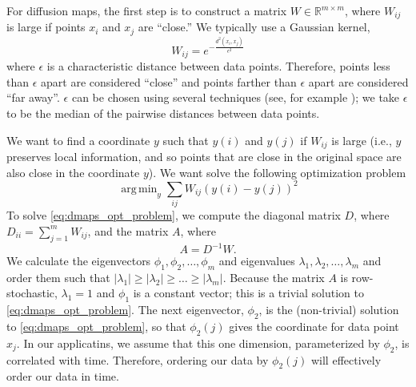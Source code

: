 \documentclass{pnastwo}
\DeclareMathOperator*{\argmin}{arg\,min}
\begin{document}
\begin{article}
\begin{materials}
For diffusion maps, the first step is to construct a matrix $W \in \mathbb{R}^{m \times m}$, where $W_{ij}$ is large if points $x_i$ and $x_j$ are ``close.'' 
%
%
We typically use a Gaussian kernel, 
\begin{equation} \label{eq:dmaps_W}
W_{ij} = e^{ -\frac{d^2(x_i, x_j)}{\epsilon^2}}
\end{equation}
where $\epsilon$ is a characteristic distance between data points.
%
Therefore, points less than $\epsilon$ apart are considered ``close'' and points farther than $\epsilon$ apart are considered ``far away''.
%
$\epsilon$ can be chosen using several techniques (see, for example \cite{coifman2008graph}); we take $\epsilon$ to be the median of the pairwise distances between data points.

We want to find a coordinate $y$ such that $y(i)$ and $y(j)$ if $W_{ij}$ is large (i.e., $y$ preserves local information, and so points that are close in the original space are also close in the coordinate $y$).
%
We want solve the following optimization problem \cite{Belkin2003}
\begin{equation} \label{eq:dmaps_opt_problem}
\argmin_{y} \sum_{ij} W_{ij} (y(i) - y(j))^2
\end{equation}
%
%
To solve \eqref{eq:dmaps_opt_problem}, we compute the diagonal matrix $D$, where $D_{ii} = \sum_{j=1}^{m} W_{ij}$, and the matrix $A$, where
\begin{equation} \label{eq:dmaps_A}
A = D^{-1} W.
\end{equation} 
%
We calculate the eigenvectors $\phi_1, \phi_2, \dots, \phi_m$ and eigenvalues $\lambda_1, \lambda_2, \dots, \lambda_m$ and order them such that $|\lambda_1| \ge |\lambda_2| \ge \dots \ge |\lambda_m|$.
%
%
Because the matrix $A$ is row-stochastic, $\lambda_1=1$ and $\phi_1$ is a constant vector; this is a trivial solution to \eqref{eq:dmaps_opt_problem}.
%
%
The next eigenvector, $\phi_2$, is the (non-trivial) solution to \eqref{eq:dmaps_opt_problem}, so that $\phi_2(j)$ gives the coordinate for data point $x_j$.
%
In our applicatins, we assume that this one dimension, parameterized by $\phi_2$, is correlated with time.
%
Therefore, ordering our data by $\phi_2(j)$ will effectively order our data in time.


\end{materials}
\end{article}
\end{document}

